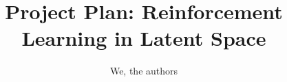 \documentclass[11pt]{article}
\title{Project Plan: Reinforcement Learning in Latent Space}
\author{We, the authors}
\begin{document}
\maketitle







{\tiny\printbibliography}

\clearpage
\raggedbottom
\appendix
\begin{appendix}
\end{appendix}
\end{document}

